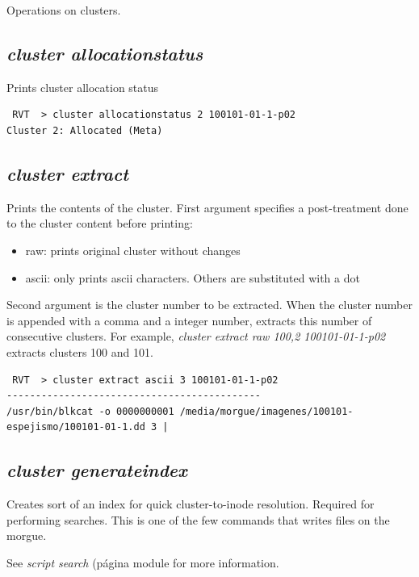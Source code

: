\documentclass[a4paper,11pt,oneside]{report}
\begin{document}
Operations on clusters.

\subsection{\emph{cluster allocationstatus}}

Prints cluster allocation status

\begin{verbatim}
 RVT  > cluster allocationstatus 2 100101-01-1-p02
Cluster 2: Allocated (Meta)
\end{verbatim}


\subsection{\emph{cluster extract}}

Prints the contents of the cluster. First argument specifies a post-treatment done to the cluster content before printing:

\begin{itemize}
\item raw:  prints original cluster without changes
\item ascii:  only prints ascii characters. Others are substituted with a dot
\end{itemize}

Second argument is the cluster number to be extracted. When the cluster number is appended with a comma and a integer number, extracts this number of consecutive clusters. For example, \emph{cluster extract raw 100,2 100101-01-1-p02} extracts clusters 100 and 101.

\begin{verbatim}
 RVT  > cluster extract ascii 3 100101-01-1-p02                                     
--------------------------------------------
/usr/bin/blkcat -o 0000000001 /media/morgue/imagenes/100101-espejismo/100101-01-1.dd 3 | 
\end{verbatim}


\subsection{\emph{cluster generateindex}}

Creates sort of an index for quick cluster-to-inode resolution. Required for performing searches. This is one of the few commands that writes files on the morgue.

See \emph{script search} (página \pageref{anx:searches} module for more information.
\end{document}
